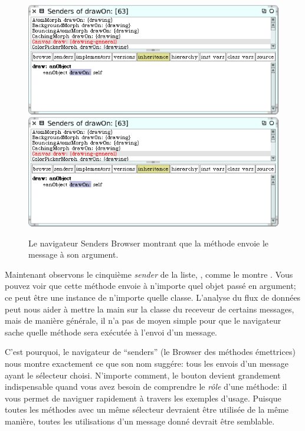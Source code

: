 \documentclass[a4paper,10pt,twoside]{book}
\begin{document}
\begin{figure}[htbp]
	\begin{center}
   \ifluluelse
		{\includegraphics[width=\textwidth]{CanvasDraw}}
		{\includegraphics[scale=0.7]{CanvasDraw}}
	\end{center}
	\caption{Le navigateur Senders Browser montrant que la m\'ethode  envoie le message  \`a son argument.	\label{fig:CanvasDraw}}
\end{figure}

Maintenant observons le cinqui\`eme \emph{sender} de la liste, , comme le montre .
Vous pouvez voir que cette m\'ethode envoie  \`a n'importe quel objet pass\'e en argument; ce peut \^etre une instance de n'importe quelle classe.
L'analyse du flux de donn\'ees peut nous aider \`a mettre la main sur la classe du receveur de certains messages, mais de mani\`ere g\'en\'erale, il n'a pas de moyen simple pour que le navigateur sache quelle m\'ethode sera ex\'ecut\'ee \`a l'envoi d'un message.

C'est pourquoi, le navigateur de ``senders'' (\ie le Browser des m\'ethodes \'emettrices) nous montre exactement ce que son nom sugg\'ere: tous les envois d'un message ayant le s\'electeur choisi.
N'importe comment, le bouton  devient grandement indispensable
quand vous avez besoin de comprendre le \emph{r\^ole} d'une m\'ethode: il vous permet de naviguer rapidement \`a travers les exemples d'usage.
Puisque toutes les m\'ethodes avec un m\^eme s\'electeur devraient \^etre utilis\'ee de la m\^eme mani\`ere, toutes les utilisations d'un message donn\'e devrait \^etre semblable.
\end{document}
